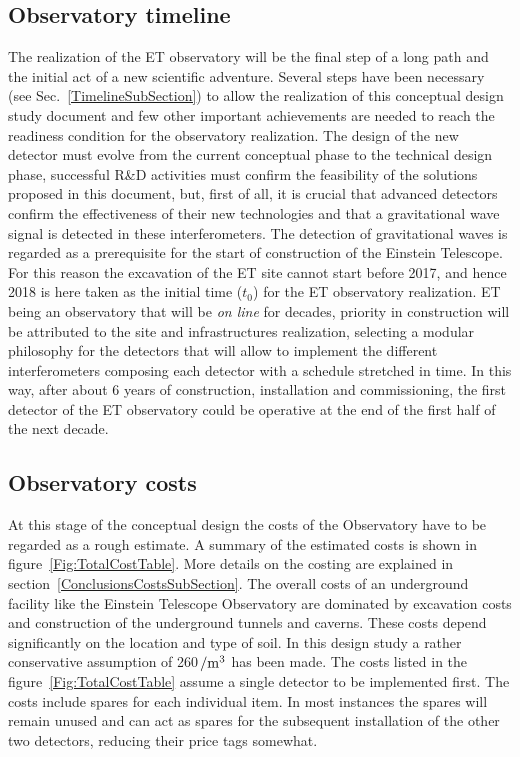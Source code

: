 \subsection{Observatory timeline}
The realization of the ET observatory will be the final step of a long path and the initial 
act of a new scientific adventure. Several steps have been necessary (see 
Sec.~\ref{TimelineSubSection}) to allow the realization of this conceptual design study 
document  and few other important achievements are needed to reach the readiness 
condition for the observatory realization. The design of the new detector must evolve 
from the current conceptual phase to the technical design phase, successful R\&D 
activities must confirm the feasibility of the solutions proposed in this document, but, 
first of all, it is crucial that advanced detectors confirm the effectiveness of their new 
technologies and that a gravitational wave signal is detected in these interferometers. 
The detection of gravitational waves is regarded as a prerequisite for the start of 
construction of the Einstein Telescope.
For this reason the excavation of the ET site cannot start before 2017, and hence 2018 
is here taken as the initial time ($t_0$) for the ET observatory realization. ET being 
an observatory that will be \emph{on line} for decades, priority in construction 
will be attributed to the site and infrastructures realization, selecting a modular 
philosophy for the detectors that will allow to implement the different interferometers 
composing each detector with a schedule stretched in time. In this way, after about 6 
years of construction, installation and commissioning, the first detector of the ET 
observatory could be operative at the end of the first half of the next decade.
\FloatBarrier
\subsection{Observatory costs}
At this stage of the conceptual design the costs of the Observatory have to be regarded 
as a rough estimate. A summary of the estimated costs is shown in 
figure~\ref{Fig:TotalCostTable}. More details on the costing are explained in 
section~\ref{ConclusionsCostsSubSection}. 
The overall costs of an underground facility like the Einstein Telescope Observatory 
are dominated by excavation costs and construction of the underground tunnels and 
caverns. These costs depend significantly on the location and type of soil. In this 
design study a rather conservative assumption of 260\,\texteuro$\rm{/m^3}$  has been 
made. The costs listed in the figure~\ref{Fig:TotalCostTable} assume a single detector 
to be implemented first. The costs include spares for each individual item. In most 
instances the spares will remain unused and can act as spares for the subsequent 
installation of the other two detectors, reducing their price tags somewhat.